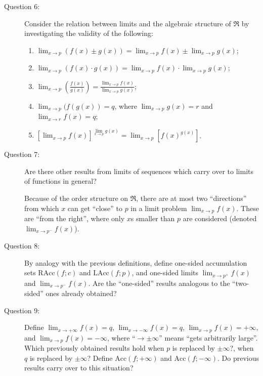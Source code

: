 \documentclass{article}
\begin{document}
\begin{description}
  \item[Question 6:] Consider the relation between limits and the algebraic structure of $\Re$ by investigating the validity of the following:
    \begin{enumerate}[\hspace{1cm}(1)]
      \item $\displaystyle \lim_{x \to p} (f(x) \pm g(x)) = \lim_{x \to p} f(x) \pm \lim_{x \to p} g(x)$;
      \item $\displaystyle \lim_{x \to p} (f(x) \cdot g(x)) = \lim_{x \to p} f(x) \cdot \lim_{x \to p} g(x)$;
      \item $\displaystyle \lim_{x \to p} \left( \frac{f(x)}{g(x)} \right) = \frac{ \lim_{x \to p} f(x) }{ \lim_{x \to p} g(x) }$;
      \item $\displaystyle \lim_{x \to p} (f(g(x)) = q$, where $\lim_{x \to p} g(x) = r$ and $\lim_{x \to r} f(x) = q$;
      \item $\displaystyle \left[ \lim_{x \to p} f(x) \right]^{\lim\limits_{x \to p} g(x)} = \lim_{x \to p} \left[ f(x)^{g(x)} \right]$.
    \end{enumerate}

  \item[Question 7:] Are there other results from limits of sequences which carry over to limits of functions in general?

  \item[] Because of the order structure on $\Re$, there are at most two ``directions'' from which $x$ can get ``close'' to $p$ in a limit problem $\displaystyle \lim_{x \to p} f(x)$. These are ``from the right'', where only $x$s smaller than $p$ are considered (denoted $\displaystyle \lim_{x \to p^-} f(x)$).

  \item[Question 8:] By analogy with the previous definitions, define one-sided accumulation sets $\text{RAcc} (f;c)$ and $\text{LAcc} (f;p)$, and one-sided limits $\displaystyle \lim_{x \to p^+} f(x)$ and $\displaystyle \lim_{x \to p^-} f(x)$. Are the ``one-sided'' results analogous to the ``two-sided'' ones already obtained?

  \item[Question 9:] Define $\displaystyle \lim_{x \to +\infty} f(x) = q$, $\displaystyle \lim_{x \to -\infty} f(x) = q$, $\displaystyle \lim_{x \to p} f(x) = +\infty$, and $\displaystyle \lim_{x \to p} f(x) = -\infty$, where ``$\to \pm \infty$''  means ``gets arbitrarily large''. Which previously obtained results hold when $p$ is replaced by $\pm \infty$?, when $q$ is replaced by $\pm \infty$? Define $\text{Acc} (f; +\infty)$ and $\text{Acc} (f; -\infty)$. Do previous results carry over to this situation?


\end{description}
\end{document}
